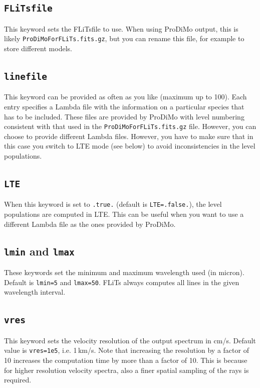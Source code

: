 \documentclass[12pt]{article}
\begin{document}
\subsection*{\texttt{FLiTsfile}}

This keyword sets the FLiTsfile to use. When using ProDiMo output, this is likely \texttt{ProDiMoForFLiTs.fits.gz}, but you can rename this file, for example to store different models.

\subsection*{\texttt{linefile}}

This keyword can be provided as often as you like (maximum up to 100). Each entry specifies a Lambda file with the information on a particular species that has to be included. These files are provided by ProDiMo with level numbering consistent with that used in the \texttt{ProDiMoForFLiTs.fits.gz} file. However, you can choose to provide different Lambda files. However, you have to make sure that in this case you switch to LTE mode (see below) to avoid inconsistencies in the level populations.

\subsection*{\texttt{LTE}}

When this keyword is set to \texttt{.true.} (default is \texttt{LTE=.false.}), the level populations are computed in LTE. This can be useful when you want to use a different Lambda file as the ones provided by ProDiMo.

\subsection*{\texttt{lmin} and \texttt{lmax}}

These keywords set the minimum and maximum wavelength used (in micron). Default is \texttt{lmin=5} and \texttt{lmax=50}. FLiTs always computes all lines in the given wavelength interval.

\subsection*{\texttt{vres}}

This keyword sets the velocity resolution of the output spectrum in cm/s. Default value is \texttt{vres=1e5}, i.e. 1\,km/s. Note that increasing the resolution by a factor of 10 increases the computation time by more than a factor of 10. This is because for higher resolution velocity spectra, also a finer spatial sampling of the rays is required.
\end{document}
